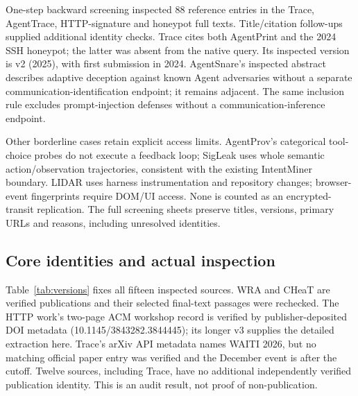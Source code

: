One-step backward screening inspected 88 reference entries in the Trace, AgentTrace, HTTP-signature and honeypot full texts. Title/citation follow-ups supplied additional identity checks. Trace cites both AgentPrint and the 2024 SSH honeypot; the latter was absent from the native query. Its inspected version is v2 (2025), with first submission in 2024. AgentSnare's inspected abstract describes adaptive deception against known Agent adversaries without a separate communication-identification endpoint; it remains adjacent. The same inclusion rule excludes prompt-injection defenses without a communication-inference endpoint.

Other borderline cases retain explicit access limits. AgentProv's categorical tool-choice probes do not execute a feedback loop; SigLeak uses whole semantic action/observation trajectories, consistent with the existing IntentMiner boundary. LIDAR uses harness instrumentation and repository changes; browser-event fingerprints require DOM/UI access. None is counted as an encrypted-transit replication. The full screening sheets preserve titles, versions, primary URLs and reasons, including unresolved identities.

\subsection{Core identities and actual inspection}
Table~\ref{tab:versions} fixes all fifteen inspected sources. WRA and CHeaT are verified publications and their selected final-text passages were rechecked. The HTTP work's two-page ACM workshop record is verified by publisher-deposited DOI metadata (10.1145/3843282.3844445); its longer v3 supplies the detailed extraction here. Trace's arXiv API metadata names WAITI 2026, but no matching official paper entry was verified and the December event is after the cutoff. Twelve sources, including Trace, have no additional independently verified publication identity. This is an audit result, not proof of non-publication.

